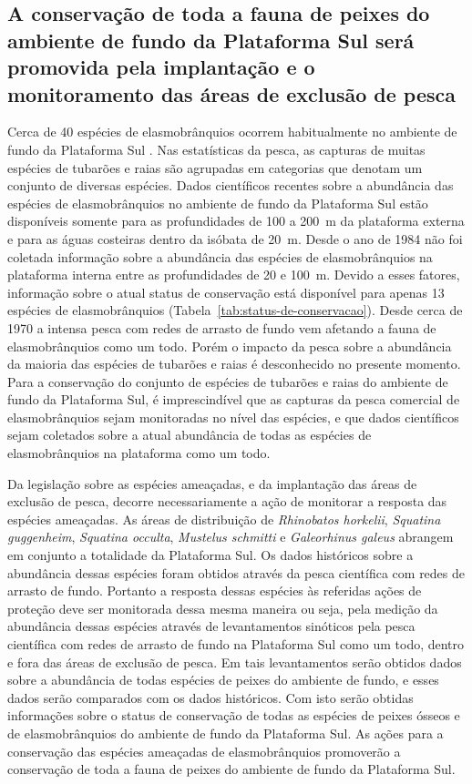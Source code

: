 \documentclass[a4paper,11pt,twoside,showtrims,onecolumn,openright,final]{memoir}
\begin{document}
\subsection*{A conservação de toda a fauna de peixes do ambiente de fundo 
             da Plataforma Sul será promovida pela implantação e o monitoramento 
	     das áreas de exclusão de pesca}
	  
Cerca de 40 espécies de elasmobrânquios ocorrem habitualmente no ambiente 
de fundo da Plataforma Sul \citep{sadowsky1973,vooren1997}. %
Nas estatísticas da pesca, as capturas de muitas espécies de tubarões e raias são 
agrupadas em categorias que denotam um conjunto de diversas espécies. Dados científicos 
recentes sobre a abundância das espécies de elasmobrânquios no ambiente de fundo da 
Plataforma Sul estão disponíveis somente para as profundidades de 100 a 200~m da plataforma 
externa e para as águas costeiras dentro da isóbata de 20~m. Desde o ano de 1984 não foi 
coletada informação sobre a abundância das espécies de elasmobrânquios na plataforma interna 
entre as profundidades de 20 e 100~m.  Devido a esses fatores, informação sobre o atual 
status de conservação está disponível para apenas 13 espécies de elasmobrânquios (Tabela~\ref{tab:status-de-conservacao}). 
Desde cerca de 1970 a intensa pesca com redes de arrasto de fundo vem afetando a fauna de 
elasmobrânquios como um todo. Porém o impacto da pesca sobre a abundância da maioria das 
espécies de tubarões e raias é desconhecido no presente momento. Para a conservação do 
conjunto de espécies de tubarões e raias do ambiente de fundo da Plataforma Sul, é 
imprescindível que as capturas da pesca comercial de elasmobrânquios sejam monitoradas 
no nível das espécies, e que dados científicos sejam coletados sobre a atual abundância 
de todas as espécies de elasmobrânquios na plataforma como um todo. 

Da legislação sobre as espécies ameaçadas, e da implantação das áreas de exclusão 
de pesca, decorre necessariamente a ação de monitorar a resposta das espécies ameaçadas. 
As áreas de distribuição de \emph{Rhinobatos horkelii}, \emph{Squatina guggenheim}, \emph{Squatina occulta}, 
\emph{Mustelus schmitti} e \emph{Galeorhinus galeus} abrangem em conjunto a totalidade da Plataforma Sul. 
Os dados históricos sobre a abundância dessas espécies foram obtidos através da pesca 
científica com redes de arrasto de fundo. Portanto a resposta dessas espécies às referidas 
ações de proteção deve ser monitorada dessa mesma maneira ou seja, pela medição da 
abundância dessas espécies através de levantamentos sinóticos pela pesca científica com 
redes de arrasto de fundo na Plataforma Sul como um todo, dentro e fora das áreas de 
exclusão de pesca. Em tais levantamentos serão obtidos dados sobre a abundância 
de todas espécies de peixes do ambiente de fundo, e esses dados serão comparados com os 
dados históricos. Com isto serão obtidas informações sobre o status de conservação de 
todas as espécies de peixes ósseos e de elasmobrânquios do ambiente de fundo da Plataforma Sul. 
As ações para a conservação das espécies ameaçadas de elasmobrânquios promoverão a 
conservação de toda a fauna de peixes do ambiente de fundo da Plataforma Sul.
\end{document}
